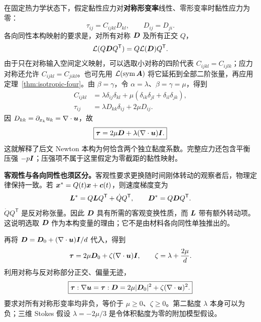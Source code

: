 在固定热力学状态下，假定黏性应力对\textbf{对称形变率}线性、零形变率时黏性应力为零：
\begin{equation}
 \tau_{ij}=C_{ijkl}D_{kl},\qquad D_{ij}=D_{ji}.
\end{equation}
各向同性本构映射的要求是，对所有对称 $\bm{D}$ 及所有正交 $Q$，
\begin{equation}
 \mathcal L(Q\bm{D}Q^{\mathsf T})=Q\mathcal L(\bm{D})Q^{\mathsf T}.
\end{equation}
由于只在对称输入空间定义映射，可以选取小对称的四阶代表 $C_{ijkl}=C_{ijlk}$；应力对称还允许 $C_{ijkl}=C_{jikl}$。也可先用 $\mathcal L(\operatorname{sym}\bm{A})$ 将它延拓到全部二阶张量，再应用定理~\ref{thm:isotropic-four}。由 $\beta=\gamma$，令 $\alpha=\lambda$、$\beta=\gamma=\mu$，得到
\begin{align}
 C_{ijkl}&=\lambda\delta_{ij}\delta_{kl}
 +\mu(\delta_{ik}\delta_{jl}+\delta_{il}\delta_{jk}),\label{eq:newton-four}\\
 \tau_{ij}&=\lambda D_{kk}\delta_{ij}+2\mu D_{ij}.
\end{align}
因 $D_{kk}=\partial_{x_k}u_k=\nabla\cdot\bm{u}$，故
\begin{equation}
 \boxed{\bm{\tau}=2\mu\bm{D}+\lambda(\nabla\cdot\bm{u})\bm{I}.}
\end{equation}
这就解释了后文 Newton 本构为何恰含两个独立黏度系数。完整应力还包含平衡压强 $-p\bm{I}$；压强项不属于这里假定为零截距的黏性映射。

\textbf{客观性与各向同性也须区分。}客观性要求更换随时间刚体转动的观察者后，物理定律保持一致。若 $\bm{x}^*=Q(t)\bm{x}+\bm{c}(t)$，则速度梯度变为
\begin{equation}
 \bm{L}^*=Q\bm{L}Q^{\mathsf T}+\dot Q Q^{\mathsf T},\qquad
 \bm{D}^*=Q\bm{D}Q^{\mathsf T}.
\end{equation}
$\dot Q Q^{\mathsf T}$ 是反对称张量。因此 $\bm{D}$ 具有所需的客观变换性质，而 $\bm{L}$ 带有额外转动项。这说明选取 $\bm{D}$ 作为本构变量的理由；它不是由材料各向同性单独推出的。

再将 $\bm{D}=\bm{D}_0+(\nabla\cdot\bm{u})\bm{I}/d$ 代入，得到
\begin{equation}
 \bm{\tau}=2\mu\bm{D}_0+\zeta(\nabla\cdot\bm{u})\bm{I},
 \qquad \zeta=\lambda+\frac{2\mu}{d}.
\end{equation}
利用对称与反对称部分正交、偏量无迹，
\begin{equation}
 \boxed{\bm{\tau}:\nabla\bm{u}=\bm{\tau}:\bm{D}
 =2\mu|\bm{D}_0|^2+\zeta(\nabla\cdot\bm{u})^2.}
\end{equation}
要求对所有对称形变率均非负，等价于 $\mu\ge0$、$\zeta\ge0$。第二黏度 $\lambda$ 本身可以为负；三维 Stokes 假设 $\lambda=-2\mu/3$ 是令体积黏度为零的附加模型假设。

